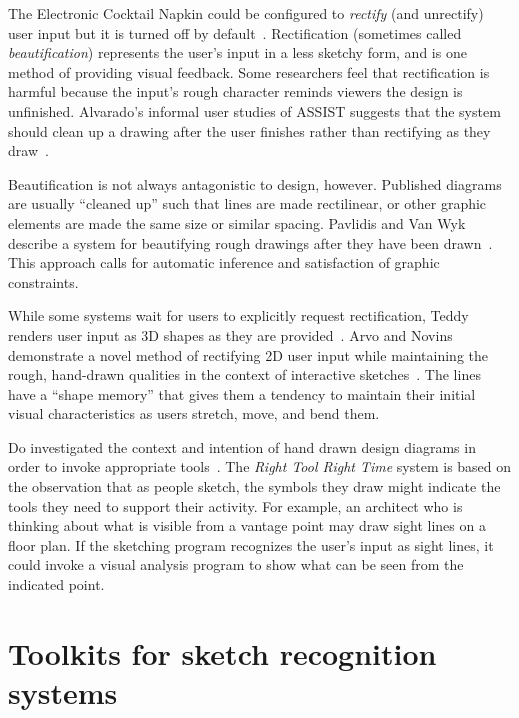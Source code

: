 The Electronic Cocktail Napkin could be configured to \textit{rectify}
(and unrectify) user input but it is turned off by
default~\cite{gross-ecn-uist,gross-cocktail}. Rectification (sometimes
called \textit{beautification}) represents the user's input in a less
sketchy form, and is one method of providing visual feedback. Some
researchers feel that rectification is harmful because the input's
rough character reminds viewers the design is unfinished. Alvarado's
informal user studies of ASSIST suggests that the system should clean
up a drawing after the user finishes rather than rectifying as they
draw~\cite[page 91]{alvarado-masters-thesis}.

Beautification is not always antagonistic to design,
however. Published diagrams are usually ``cleaned up'' such that lines
are made rectilinear, or other graphic elements are made the same size
or similar spacing. Pavlidis and Van Wyk describe a system for
beautifying rough drawings after they have been
drawn~\cite{pavlidis-beautifier}. This approach calls for automatic
inference and satisfaction of graphic constraints. 

While some systems wait for users to explicitly request rectification,
Teddy renders user input as 3D shapes as they are
provided~\cite{igarashi-teddy}. Arvo and Novins demonstrate a novel
method of rectifying 2D user input while maintaining the rough,
hand-drawn qualities in the context of interactive
sketches~\cite{arvo-beautification}. The lines have a ``shape memory''
that gives them a tendency to maintain their initial visual
characteristics as users stretch, move, and bend them.

Do investigated the context and intention of hand drawn design
diagrams in order to invoke appropriate
tools~\cite{do-phd-thesis,do-design-sketches-tools}. The \textit{Right
Tool Right Time} system is based on the observation that as people
sketch, the symbols they draw might indicate the tools they need to
support their activity. For example, an architect who is thinking
about what is visible from a vantage point may draw sight lines on a
floor plan. If the sketching program recognizes the user's input as
sight lines, it could invoke a visual analysis program to show what
can be seen from the indicated point.

\section{Toolkits for sketch recognition systems}
\label{sec:recognition-toolkits}

